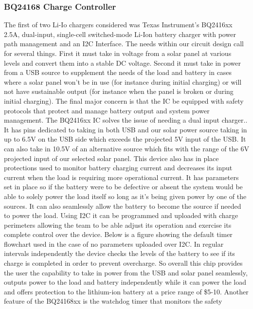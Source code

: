 \subsubsection{BQ24168 Charge Controller}
The first of two Li-Io chargers considered was Texas Instrument's BQ2416xx 2.5A, dual-input, single-cell switched-mode Li-Ion battery charger with power path management and an I2C Interface. The needs within our circuit design call for several things. First it must take in voltage from a solar panel at various levels and convert them into a stable DC voltage. Second it must take in power from a USB source to supplement the needs of the load and battery in cases where a solar panel won't be in use (for instance during initial charging) or will not have sustainable output (for instance when the panel is broken or during initial charging). The final major concern is that the IC be equipped with safety protocols that protect and manage battery output and system power management. The BQ2416xx IC solves the issue of needing a dual input charger.. It has pins dedicated to taking in both USB and our solar power source taking in up to 6.5V on the USB side which exceeds the projected 5V input of the USB. It can also take in 10.5V of an alternative source which fits with the range of the 6V projected input of our selected solar panel. This device also has in place protections used to monitor battery charging current and decreases its input current when the load is requiring more operational current. It has parameters set in place so if the battery were to be defective or absent the system would be able to solely power the load itself so long as it's being given power by one of the sources. It can also seamlessly allow the battery to become the source if needed to power the load. Using I2C it can be programmed and uploaded with charge perimeters allowing the team to be able adjust its operation and exercise its complete control over the device. Below is a figure showing the default timer flowchart used in the case of no parameters uploaded over I2C. In regular intervals independently the device checks the levels of the battery to see if its charge is completed in order to prevent overcharge. So overall this chip provides the user the capability to take in power from the USB and solar panel seamlessly, outputs power to the load and battery independently while it can power the load and offers protection to the lithium-ion battery at a price range of \$5-10. Another feature of the BQ24168xx is the watchdog timer that monitors the safety 

